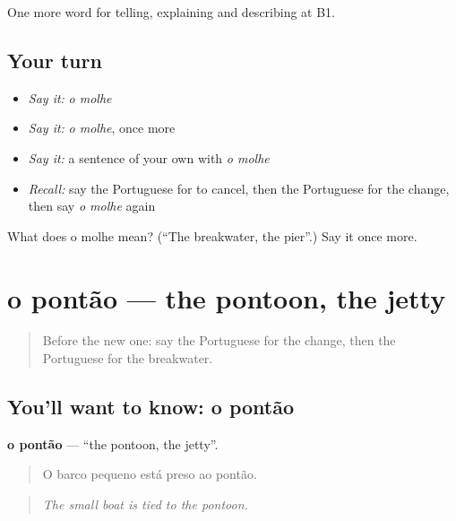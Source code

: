 \begin{grammarlens}[title={What you've built}]
One more word for telling, explaining and describing at B1.
\end{grammarlens}

\subsection*{Your turn}
\begin{itemize}
\raggedright
  \item \emph{Say it:} \emph{o molhe}
  \item \emph{Say it:} \emph{o molhe}, once more
  \item \emph{Say it:} a sentence of your own with \emph{o molhe}
  \item \emph{Recall:} say the Portuguese for to cancel, then the Portuguese for the change, then say \emph{o molhe} again
\end{itemize}

\begin{tcolorbox}[breakable,colback=teal!4,colframe=teal!35!black,title={Before you move on}]
What does o molhe mean? (\textquotedblleft{}The breakwater, the pier\textquotedblright{}.) Say it once more.
\end{tcolorbox}
\section[o pontão]{o pontão — the pontoon, the jetty}

\label{lesson:PT-C417-pontao}



\begin{quote}
Before the new one: say the Portuguese for the change, then the Portuguese for the breakwater.
\end{quote}

\subsection*{You'll want to know: o pontão}
\textbf{o pontão} — \textquotedblleft{}the pontoon, the jetty\textquotedblright{}.

\begin{quote}
O barco pequeno está preso ao pontão.
\end{quote}

\begin{quote}
\emph{The small boat is tied to the pontoon.}
\end{quote}

